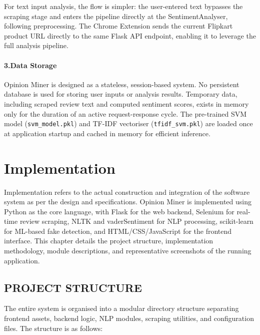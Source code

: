 \documentclass[12pt,a4paper]{report}
\begin{document}
For text input analysis, the flow is simpler: the user-entered text bypasses the scraping stage and enters the pipeline directly at the SentimentAnalyser, following preprocessing. The Chrome Extension sends the current Flipkart product URL directly to the same Flask API endpoint, enabling it to leverage the full analysis pipeline.

\subsubsection*{3.\quad Data Storage}

Opinion Miner is designed as a stateless, session-based system. No persistent database is used for storing user inputs or analysis results. Temporary data, including scraped review text and computed sentiment scores, exists in memory only for the duration of an active request-response cycle. The pre-trained SVM model (\texttt{svm\_model.pkl}) and TF-IDF vectoriser (\texttt{tfidf\_svm.pkl}) are loaded once at application startup and cached in memory for efficient inference.

\chapter{Implementation}

Implementation refers to the actual construction and integration of the software system as per the design and specifications. Opinion Miner is implemented using Python as the core language, with Flask for the web backend, Selenium for real-time review scraping, NLTK and vaderSentiment for NLP processing, scikit-learn for ML-based fake detection, and HTML/CSS/JavaScript for the frontend interface. This chapter details the project structure, implementation methodology, module descriptions, and representative screenshots of the running application.

\section{PROJECT STRUCTURE}

The entire system is organised into a modular directory structure separating frontend assets, backend logic, NLP modules, scraping utilities, and configuration files. The structure is as follows:
\end{document}
